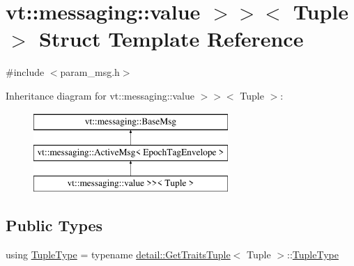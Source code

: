 \hypertarget{structvt_1_1messaging_1_1_param_msg_3_01_tuple_00_01std_1_1enable__if__t_3_01is__byte__copyable_50e4a53750896883a846627550850f59}{}\section{vt\+:\+:messaging\+:\+:value $>$$>$$<$ Tuple $>$ Struct Template Reference}
\label{structvt_1_1messaging_1_1_param_msg_3_01_tuple_00_01std_1_1enable__if__t_3_01is__byte__copyable_50e4a53750896883a846627550850f59}


{\ttfamily \#include $<$param\+\_\+msg.\+h$>$}

Inheritance diagram for vt\+:\+:messaging\+:\+:value $>$$>$$<$ Tuple $>$\+:\begin{figure}[H]
\begin{center}
\leavevmode
\includegraphics[height=3.000000cm]{structvt_1_1messaging_1_1_param_msg_3_01_tuple_00_01std_1_1enable__if__t_3_01is__byte__copyable_50e4a53750896883a846627550850f59}
\end{center}
\end{figure}
\subsection*{Public Types}
\begin{DoxyCompactItemize}
\item 
using \hyperlink{structvt_1_1messaging_1_1_param_msg_3_01_tuple_00_01std_1_1enable__if__t_3_01is__byte__copyable_50e4a53750896883a846627550850f59_a63c0c672da0bf7b284da9647aad497f8}{Tuple\+Type} = typename \hyperlink{structvt_1_1messaging_1_1detail_1_1_get_traits_tuple}{detail\+::\+Get\+Traits\+Tuple}$<$ Tuple $>$\+::\hyperlink{structvt_1_1messaging_1_1_param_msg_3_01_tuple_00_01std_1_1enable__if__t_3_01is__byte__copyable_50e4a53750896883a846627550850f59_a63c0c672da0bf7b284da9647aad497f8}{Tuple\+Type}
\end{DoxyCompactItemize}
